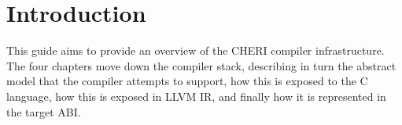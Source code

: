 \section*{Introduction}

This guide aims to provide an overview of the CHERI compiler infrastructure.
The four chapters move down the compiler stack, describing in turn the abstract model that the compiler attempts to support, how this is exposed to the C language, how this is exposed in LLVM IR, and finally how it is represented in the target ABI.

